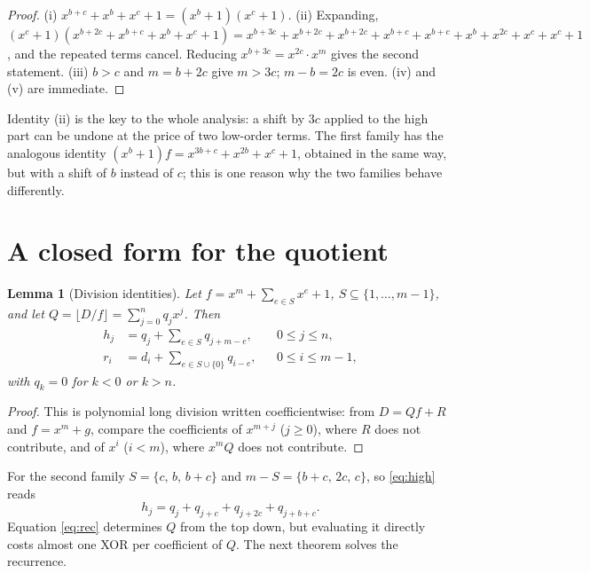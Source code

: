 \documentclass[11pt,a4paper]{article}
\theoremstyle{plain}
\newtheorem{lemma}[theorem]{Lemma}
\theoremstyle{definition}
\begin{document}
\begin{proof}
(i) $x^{b+c}+x^b+x^c+1=(x^b+1)(x^c+1)$. (ii) Expanding,
$(x^c+1)(x^{b+2c}+x^{b+c}+x^b+x^c+1)
=x^{b+3c}+x^{b+2c}+x^{b+2c}+x^{b+c}+x^{b+c}+x^b+x^{2c}+x^c+x^c+1$, and the repeated terms
cancel. Reducing $x^{b+3c}=x^{2c}\cdot x^m$ gives the second statement. (iii) $b>c$ and
$m=b+2c$ give $m>3c$; $m-b=2c$ is even. (iv) and (v) are immediate.
\end{proof}

Identity (ii) is the key to the whole analysis: a shift by $3c$ applied to the high part
can be undone at the price of two low-order terms. The first family has the analogous
identity $(x^b+1)f=x^{3b+c}+x^{2b}+x^c+1$, obtained in the same way, but with a shift of
$b$ instead of $c$; this is one reason why the two families behave differently.

\section{A closed form for the quotient}\label{sec:quotient}

\begin{lemma}[Division identities]\label{lem:division}
Let $f=x^m+\sum_{e\in S}x^e+1$, $S\subseteq\{1,\dots,m-1\}$, and let $Q=\lfloor D/f\rfloor
=\sum_{j=0}^{n}q_jx^j$. Then
\begin{align}
  h_j &= q_j+\sum_{e\in S} q_{j+m-e}, && 0\le j\le n, \label{eq:high}\\
  r_i &= d_i+\sum_{e\in S\cup\{0\}} q_{i-e}, && 0\le i\le m-1, \label{eq:low}
\end{align}
with $q_k=0$ for $k<0$ or $k>n$.
\end{lemma}

\begin{proof}
This is polynomial long division written coefficientwise: from $D=Qf+R$ and
$f=x^m+g$, compare the coefficients of $x^{m+j}$ ($j\ge0$), where $R$ does not
contribute, and of $x^i$ ($i<m$), where $x^mQ$ does not contribute.
\end{proof}

For the second family $S=\{c,\,b,\,b+c\}$ and $m-S=\{b+c,\,2c,\,c\}$, so \eqref{eq:high}
reads
\begin{equation}\label{eq:rec}
  h_j=q_j+q_{j+c}+q_{j+2c}+q_{j+b+c}.
\end{equation}
Equation \eqref{eq:rec} determines $Q$ from the top down, but evaluating it directly
costs almost one XOR per coefficient of $Q$. The next theorem solves the recurrence.
\end{document}
